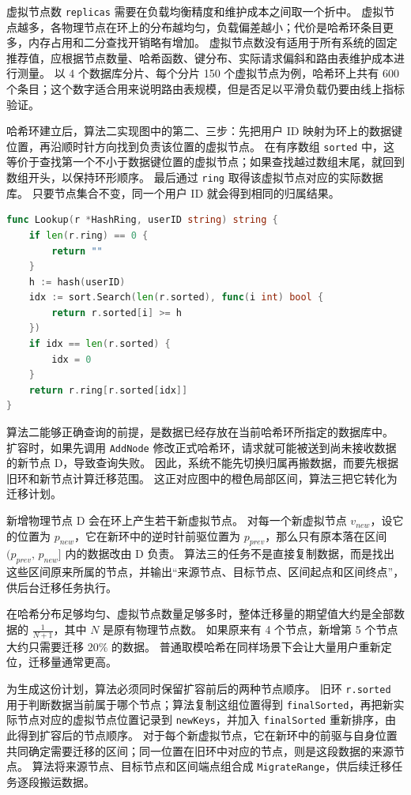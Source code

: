虚拟节点数 \texttt{replicas} 需要在负载均衡精度和维护成本之间取一个折中。
虚拟节点越多，各物理节点在环上的分布越均匀，负载偏差越小；代价是哈希环条目更多，内存占用和二分查找开销略有增加。
虚拟节点数没有适用于所有系统的固定推荐值，应根据节点数量、哈希函数、键分布、实际请求偏斜和路由表维护成本进行测量。
以 4 个数据库分片、每个分片 150 个虚拟节点为例，哈希环上共有 600 个条目；这个数字适合用来说明路由表规模，但是否足以平滑负载仍要由线上指标验证。

哈希环建立后，算法二实现图中的第二、三步：先把用户 ID 映射为环上的数据键位置，再沿顺时针方向找到负责该位置的虚拟节点。
在有序数组 \texttt{sorted} 中，这等价于查找第一个不小于数据键位置的虚拟节点；如果查找越过数组末尾，就回到数组开头，以保持环形顺序。
最后通过 \texttt{ring} 取得该虚拟节点对应的实际数据库。
只要节点集合不变，同一个用户 ID 就会得到相同的归属结果。

\begin{tcolorbox}[title=算法二：根据哈希环查询对象归属]
\begin{lstlisting}[style=codeblock, language=go]
func Lookup(r *HashRing, userID string) string {
    if len(r.ring) == 0 {
        return ""
    }
    h := hash(userID)
    idx := sort.Search(len(r.sorted), func(i int) bool {
        return r.sorted[i] >= h
    })
    if idx == len(r.sorted) {
        idx = 0
    }
    return r.ring[r.sorted[idx]]
}
\end{lstlisting}
\end{tcolorbox}

算法二能够正确查询的前提，是数据已经存放在当前哈希环所指定的数据库中。
扩容时，如果先调用 \texttt{AddNode} 修改正式哈希环，请求就可能被送到尚未接收数据的新节点 D，导致查询失败。
因此，系统不能先切换归属再搬数据，而要先根据旧环和新节点计算迁移范围。
这正对应图中的橙色局部区间，算法三把它转化为迁移计划。

新增物理节点 D 会在环上产生若干新虚拟节点。
对每一个新虚拟节点 $v_{new}$，设它的位置为 $p_{new}$，它在新环中的逆时针前驱位置为 $p_{prev}$，那么只有原本落在区间 $(p_{prev},\, p_{new}]$ 内的数据改由 D 负责。
算法三的任务不是直接复制数据，而是找出这些区间原来所属的节点，并输出“来源节点、目标节点、区间起点和区间终点”，供后台迁移任务执行。

在哈希分布足够均匀、虚拟节点数量足够多时，整体迁移量的期望值大约是全部数据的 $\frac{1}{N+1}$，其中 $N$ 是原有物理节点数。
如果原来有 4 个节点，新增第 5 个节点大约只需要迁移 $20\%$ 的数据。
普通取模哈希在同样场景下会让大量用户重新定位，迁移量通常更高。

为生成这份计划，算法必须同时保留扩容前后的两种节点顺序。
旧环 \texttt{r.sorted} 用于判断数据当前属于哪个节点；算法复制这组位置得到 \texttt{finalSorted}，再把新实际节点对应的虚拟节点位置记录到 \texttt{newKeys}，并加入 \texttt{finalSorted} 重新排序，由此得到扩容后的节点顺序。
对于每个新虚拟节点，它在新环中的前驱与自身位置共同确定需要迁移的区间；同一位置在旧环中对应的节点，则是这段数据的来源节点。
算法将来源节点、目标节点和区间端点组合成 \texttt{MigrateRange}，供后续迁移任务逐段搬运数据。

